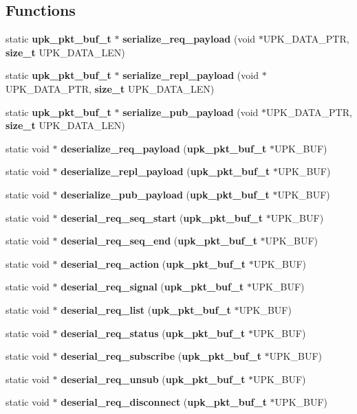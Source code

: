 \subsection*{Functions}
\begin{DoxyCompactItemize}
\item 
static {\bf upk\_\-pkt\_\-buf\_\-t} $\ast$ {\bf serialize\_\-req\_\-payload} (void $\ast$UPK\_\-DATA\_\-PTR, {\bf size\_\-t} UPK\_\-DATA\_\-LEN)
\item 
static {\bf upk\_\-pkt\_\-buf\_\-t} $\ast$ {\bf serialize\_\-repl\_\-payload} (void $\ast$UPK\_\-DATA\_\-PTR, {\bf size\_\-t} UPK\_\-DATA\_\-LEN)
\item 
static {\bf upk\_\-pkt\_\-buf\_\-t} $\ast$ {\bf serialize\_\-pub\_\-payload} (void $\ast$UPK\_\-DATA\_\-PTR, {\bf size\_\-t} UPK\_\-DATA\_\-LEN)
\item 
static void $\ast$ {\bf deserialize\_\-req\_\-payload} ({\bf upk\_\-pkt\_\-buf\_\-t} $\ast$UPK\_\-BUF)
\item 
static void $\ast$ {\bf deserialize\_\-repl\_\-payload} ({\bf upk\_\-pkt\_\-buf\_\-t} $\ast$UPK\_\-BUF)
\item 
static void $\ast$ {\bf deserialize\_\-pub\_\-payload} ({\bf upk\_\-pkt\_\-buf\_\-t} $\ast$UPK\_\-BUF)
\item 
static void $\ast$ {\bf deserial\_\-req\_\-seq\_\-start} ({\bf upk\_\-pkt\_\-buf\_\-t} $\ast$UPK\_\-BUF)
\item 
static void $\ast$ {\bf deserial\_\-req\_\-seq\_\-end} ({\bf upk\_\-pkt\_\-buf\_\-t} $\ast$UPK\_\-BUF)
\item 
static void $\ast$ {\bf deserial\_\-req\_\-action} ({\bf upk\_\-pkt\_\-buf\_\-t} $\ast$UPK\_\-BUF)
\item 
static void $\ast$ {\bf deserial\_\-req\_\-signal} ({\bf upk\_\-pkt\_\-buf\_\-t} $\ast$UPK\_\-BUF)
\item 
static void $\ast$ {\bf deserial\_\-req\_\-list} ({\bf upk\_\-pkt\_\-buf\_\-t} $\ast$UPK\_\-BUF)
\item 
static void $\ast$ {\bf deserial\_\-req\_\-status} ({\bf upk\_\-pkt\_\-buf\_\-t} $\ast$UPK\_\-BUF)
\item 
static void $\ast$ {\bf deserial\_\-req\_\-subscribe} ({\bf upk\_\-pkt\_\-buf\_\-t} $\ast$UPK\_\-BUF)
\item 
static void $\ast$ {\bf deserial\_\-req\_\-unsub} ({\bf upk\_\-pkt\_\-buf\_\-t} $\ast$UPK\_\-BUF)
\item 
static void $\ast$ {\bf deserial\_\-req\_\-disconnect} ({\bf upk\_\-pkt\_\-buf\_\-t} $\ast$UPK\_\-BUF)

\end{DoxyCompactItemize}

